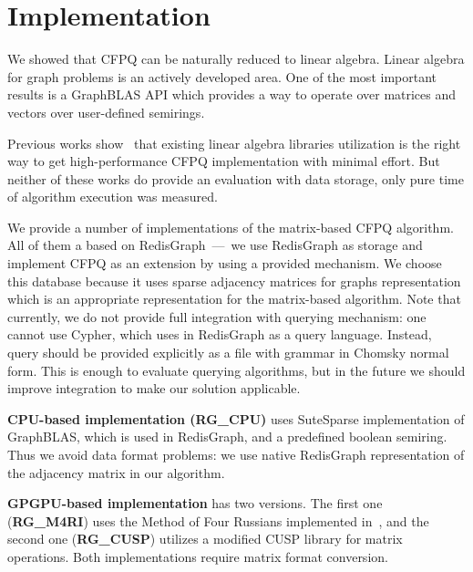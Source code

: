 \section{Implementation}

We showed that CFPQ can be naturally reduced to linear algebra.
Linear algebra for graph problems is an actively developed area.
One of the most important results is a GraphBLAS API which provides a way to operate over matrices and vectors over user-defined semirings.

Previous works show~\cite{Mishin:2019:ECP:3327964.3328503, Azimov:2018:CPQ:3210259.3210264} that existing linear algebra libraries utilization is the right way to get high-performance CFPQ implementation with minimal effort.
But neither of these works do provide an evaluation with data storage, only pure time of algorithm execution was measured.

We provide a number of implementations of the matrix-based CFPQ algorithm.
All of them a based on RedisGraph~---~we use RedisGraph as storage and implement CFPQ as an extension by using a provided mechanism.
We choose this database because it uses sparse adjacency matrices for graphs representation which is an appropriate representation for the matrix-based algorithm.
Note that currently, we do not provide full integration with querying mechanism: one cannot use Cypher, which uses in RedisGraph as a query language.
Instead, query should be provided explicitly as a file with grammar in Chomsky normal form.
This is enough to evaluate querying algorithms, but in the future we should improve integration to make our solution applicable.

\textbf{CPU-based implementation (RG\_CPU)} uses SuteSparse implementation of GraphBLAS, which is used in RedisGraph, and a predefined boolean semiring.
Thus we avoid data format problems: we use native RedisGraph representation of the adjacency matrix in our algorithm.

\textbf{GPGPU-based implementation} has two versions.
The first one (\textbf{RG\_M4RI}) uses the Method of Four Russians implemented in~\cite{Mishin:2019:ECP:3327964.3328503}, and the second one (\textbf{RG\_CUSP}) utilizes a modified CUSP library for matrix operations.
Both implementations require matrix format conversion.
